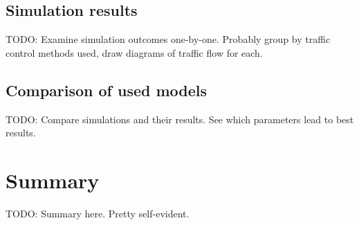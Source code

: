 \documentclass[english, 12pt, a4paper, elec, utf8, pdfa, online]{aaltothesis}
\begin{document}
\subsection{Simulation results}

TODO: Examine simulation outcomes one-by-one. Probably group by traffic control methods used, draw diagrams of traffic flow for each.

\subsection{Comparison of used models}

TODO: Compare simulations and their results. See which parameters lead to best results.

\clearpage

\section{Summary}

TODO: Summary here. Pretty self-evident.

\clearpage

\thesisbibliography

{}


\clearpage

\thesisappendix
\end{document}
